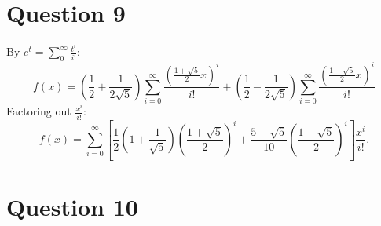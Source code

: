 \documentclass[12pt,a4paper]{article}
\begin{document}
\section*{Question 9}
\begin{solution}
By $e^t=\sum_0^{\infty} \frac{t^i}{i!}$:
\[
f(x) = \left(\frac{1}{2}+\frac{1}{2\sqrt{5}}\right) \sum_{i=0}^{\infty} \frac{\left(\frac{1+\sqrt{5}}{2} x\right)^i}{i!}
+\left(\frac{1}{2}-\frac{1}{2\sqrt{5}}\right)
\sum_{i=0}^{\infty} \frac{\left(\frac{1-\sqrt{5}}{2} x\right)^i}{i!}
\]
Factoring out $\frac{x^i}{i!}$:
\[
f(x) = \sum_{i=0}^{\infty} \left[\frac{1}{2}\left(1+\frac{1}{\sqrt{5}}\right)\left(\frac{1+\sqrt{5}}{2}\right)^i 
+ \frac{5-\sqrt{5}}{10}\left(\frac{1-\sqrt{5}}{2}\right)^i\right] \frac{x^i}{i!}.
\]
\end{solution}

\section*{Question 10}
\end{document}
